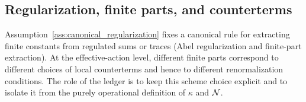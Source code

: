 \subsection{Regularization, finite parts, and counterterms}
\label{subsec:regularization_counterterms}

Assumption~\ref{ass:canonical_regularization} fixes a canonical rule for extracting finite constants from regulated sums or traces (Abel regularization and finite-part extraction).
At the effective-action level, different finite parts correspond to different choices of local counterterms and hence to different renormalization conditions.
The role of the ledger is to keep this scheme choice explicit and to isolate it from the purely operational definition of $\kappa$ and $\mathcal{N}$.



